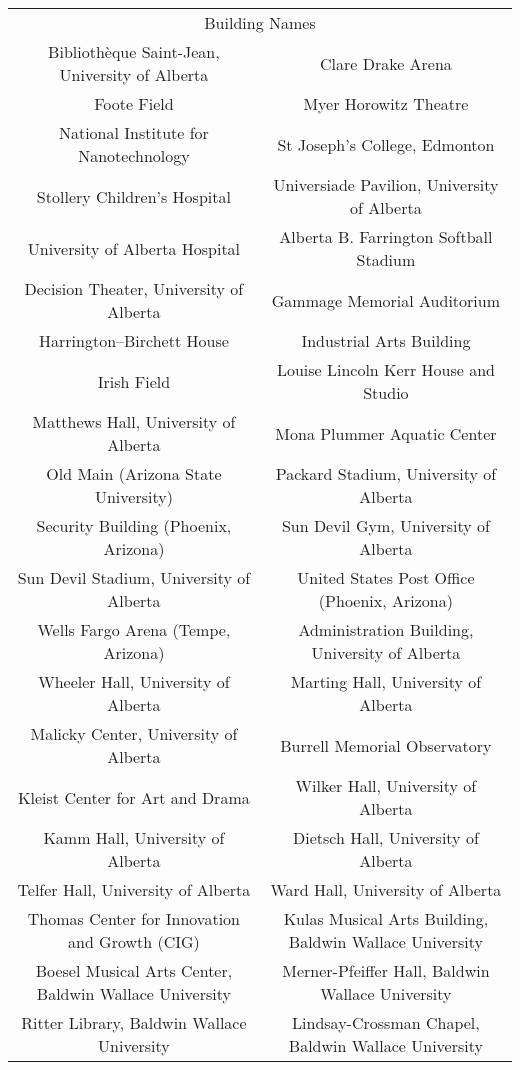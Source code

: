 \documentclass[sigconf]{acmart}
\begin{document}
\setlength{\tabcolsep}{1pt}
\begin{table*}
\small
\begin{center}
\begin{tabular}{c|c}
\hline
\multicolumn{2}{c}{Building Names}\\
\shline
Bibliothèque Saint-Jean, University of Alberta & Clare Drake Arena\\
Foote Field & Myer Horowitz Theatre\\
National Institute for Nanotechnology & St Joseph's College, Edmonton\\
Stollery Children's Hospital & Universiade Pavilion, University of Alberta\\
University of Alberta Hospital & Alberta B. Farrington Softball Stadium\\
Decision Theater, University of Alberta & Gammage Memorial Auditorium\\
Harrington–Birchett House & Industrial Arts Building\\
Irish Field & Louise Lincoln Kerr House and Studio\\
Matthews Hall, University of Alberta & Mona Plummer Aquatic Center\\
Old Main (Arizona State University) & Packard Stadium, University of Alberta\\
Security Building (Phoenix, Arizona) & Sun Devil Gym, University of Alberta\\
Sun Devil Stadium, University of Alberta & United States Post Office (Phoenix, Arizona)\\
Wells Fargo Arena (Tempe, Arizona) & Administration Building, University of Alberta\\
Wheeler Hall, University of Alberta & Marting Hall, University of Alberta\\
Malicky Center, University of Alberta & Burrell Memorial Observatory\\
Kleist Center for Art and Drama & Wilker Hall, University of Alberta\\
Kamm Hall, University of Alberta & Dietsch Hall, University of Alberta\\
Telfer Hall, University of Alberta & Ward Hall, University of Alberta\\
Thomas Center for Innovation and Growth (CIG) & Kulas Musical Arts Building, Baldwin Wallace University\\
Boesel Musical Arts Center, Baldwin Wallace University & Merner-Pfeiffer Hall, Baldwin Wallace University\\
Ritter Library, Baldwin Wallace University & Lindsay-Crossman Chapel, Baldwin Wallace University\\

\end{tabular}
\end{center}
\end{table*}
\end{document}
